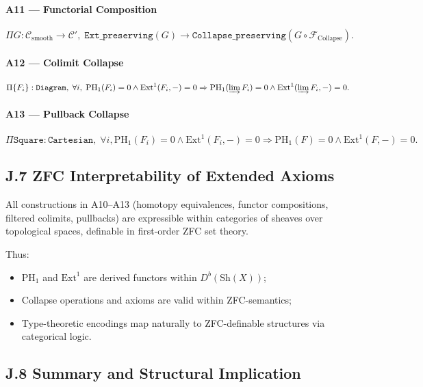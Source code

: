 \documentclass[11pt]{article}
\begin{document}
\paragraph{A11 — Functorial Composition}
\[
\Pi G : \mathcal{C}_{\mathrm{smooth}} \to \mathcal{C}', \;
\texttt{Ext\_preserving}(G) \to \texttt{Collapse\_preserving}(G \circ \mathcal{F}_{\mathrm{Collapse}}).
\]

\paragraph{A12 — Colimit Collapse}
\[
\Pi \{ F_i \} : \texttt{Diagram}, \;
\forall i, \; \mathrm{PH}_1(F_i) = 0 \wedge \mathrm{Ext}^1(F_i, -) = 0 \Rightarrow \mathrm{PH}_1(\varinjlim F_i) = 0 \wedge \mathrm{Ext}^1(\varinjlim F_i, -) = 0.
\]

\paragraph{A13 — Pullback Collapse}
\[
\Pi \texttt{Square} : \texttt{Cartesian}, \;
\forall i, \mathrm{PH}_1(F_i) = 0 \wedge \mathrm{Ext}^1(F_i, -) = 0 \Rightarrow \mathrm{PH}_1(F) = 0 \wedge \mathrm{Ext}^1(F, -) = 0.
\]

\subsection*{J.7 ZFC Interpretability of Extended Axioms}

All constructions in A10–A13 (homotopy equivalences, functor compositions, filtered colimits, pullbacks) are expressible within categories of sheaves over topological spaces, definable in first-order ZFC set theory.

Thus:

\begin{itemize}
    \item \( \mathrm{PH}_1 \) and \( \mathrm{Ext}^1 \) are derived functors within \( D^b(\mathrm{Sh}(X)) \);
    \item Collapse operations and axioms are valid within ZFC-semantics;
    \item Type-theoretic encodings map naturally to ZFC-definable structures via categorical logic.
\end{itemize}

\subsection*{J.8 Summary and Structural Implication}
\end{document}
